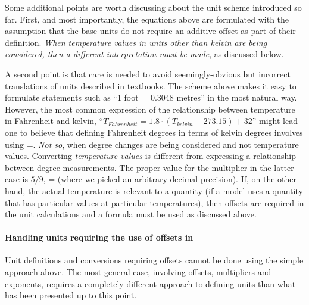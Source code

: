 Some additional points are worth discussing about the unit scheme
introduced so far.  First, and most importantly, the equations
above are formulated with the assumption that the base units do
not require an additive offset as part of their definition.
\emph{When temperature values in units other than kelvin are being
  considered, then a different interpretation must be made}, as
discussed below.

A second point is that care is needed to avoid seemingly-obvious
but incorrect translations of units described in textbooks.  The
scheme above makes it easy to formulate statements such as ``1
foot = 0.3048 metres'' in the most natural way.  However, the most
common expression of the relationship between temperature in
Fahrenheit and kelvin, ``$T_{Fahrenheit} = 1.8 \cdot (T_{kelvin} -
273.15) + 32$'' might lead one to believe that defining Fahrenheit
degrees in terms of kelvin degrees involves using
=.  \emph{Not so}, when degree changes
are being considered and not temperature values.  Converting
\emph{temperature values} is different from expressing a
relationship between degree measurements.  The proper value for
the multiplier in the latter case is $5/9$, \ie
{}= (where we picked an arbitrary
decimal precision).  If, on the other hand, the actual temperature
is relevant to a quantity (\eg if a model uses a quantity that has
particular values at particular temperatures), then offsets are
required in the unit calculations and a formula must be used as
discussed above.


\paragraph{Handling units requiring the use of offsets in \sbmltwothree}

Unit definitions and conversions requiring offsets cannot be done
using the simple approach above.  The most general case, involving
offsets, multipliers and exponents, requires a completely
different approach to defining units than what has been presented
up to this point.

